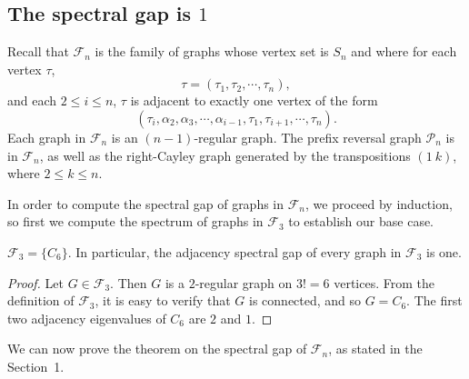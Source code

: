 

\subsection{The spectral gap is $1$}

Recall that $\mathcal{F}_n$ is the family of graphs whose vertex set is $S_n$ and
where for each vertex $\tau$,
\[ \tau = (\tau_1, \tau_2, \cdots, \tau_n), \]
and each $2 \leq i \leq n$, $\tau$ is adjacent to exactly one vertex of the form 
\[ (\tau_i, \alpha_2, \alpha_3, \cdots, \alpha_{i-1}, \tau_1, \tau_{i+1}, \cdots, \tau_n). \]
Each graph in $\mathcal{F}_n$ is an $(n-1)$-regular graph.  The prefix reversal graph $\mathcal{P}_n$
is in $\mathcal{F}_n$, as well as the right-Cayley graph generated by the transpositions $(1\ k)$,
where $2 \leq k \leq n$.


In order to compute the spectral gap of graphs in $\mathcal{F}_n$, we proceed
by induction, so first we compute the spectrum of graphs in $\mathcal{F}_3$ to 
establish our base case.  

\begin{lemma}\label{base_case}
  $\mathcal{F}_3 = \{ C_6 \}$.  In particular, the adjacency spectral gap of every graph in
  $\mathcal{F}_3$ is one.
\end{lemma}
\begin{proof}
  Let $G \in \mathcal{F}_3$.  Then $G$ is a $2$-regular graph on $3! = 6$ vertices.
  From the definition of $\mathcal{F}_3$, it is easy to verify that $G$ is connected,
  and so $G = C_6$.  The first two adjacency eigenvalues of $C_6$ are $2$ and $1$.
\end{proof}


We can now prove the  theorem on the spectral gap of ${\mathcal F}_n$, as stated in the Section~1.

